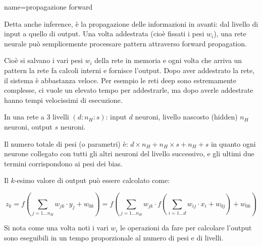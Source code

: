 {
name={propagazione forward}
}{
Detta anche inference, è la propagazione
delle informazioni in avanti: dal livello di input a quello di output.
Una volta addestrata (cioè fissati i pesi \(w_i\)), una rete neurale può semplicemente
processare pattern attraverso forward propagation.

Cioè si salvano i vari pesi \(w_i\) della rete in memoria e ogni volta che arriva un pattern la rete fa calcoli interni e fornisce l'output. Dopo aver addestrato la rete, il sistema è abbastanza veloce. Per esempio le reti deep  sono estremamente complesse, ci vuole un elevato tempo per addestrarle, ma dopo averle addestrate hanno tempi velocissimi di esecuzione.

In una rete a 3 livelli \( \left(d: n_{H}: s\right) \):
input \( d \) neuroni, livello nascosto (hidden) \( n_{H} \) neuroni, output \( s \) neuroni.

Il numero totale di pesi (o parametri) è: \( d \times n_{H}+n_{H} \times s+n_{H}+s \) in quanto ogni neurone collegato con tutti gli altri neuroni del livello successivo, e gli ultimi due termini corrispondono ai pesi dei bias.

Il \( k \)-esimo valore di output può essere calcolato come:

\[ z_{k}=f\left(\sum_{j=1 \ldots n_{H}} w_{j k} \cdot y_{j}+w_{0 k}\right)=f\left(\sum_{j=1 \ldots n_{H}} w_{j k} \cdot f\left(\sum_{i=1 \ldots d} w_{i j} \cdot x_{i}+w_{0 j}\right)+w_{0 k}\right) \]

Si nota come una volta noti i vari \(w_i\) le operazioni da fare per calcolare l'output sono eseguibili in un tempo proporzionale al numero di pesi e di livelli.
}


